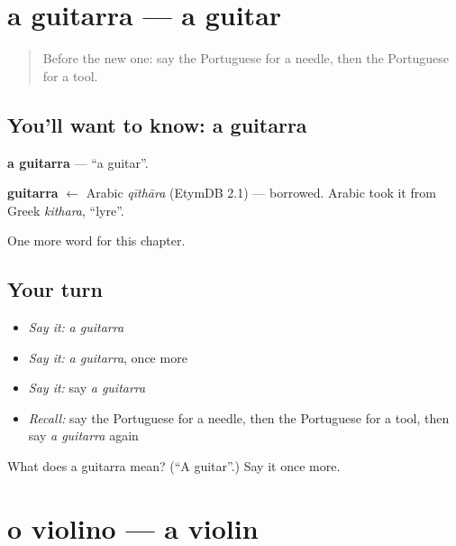\section[a guitarra]{a guitarra — a guitar}

\label{lesson:PT-C196-guitarra}



\begin{quote}
Before the new one: say the Portuguese for a needle, then the Portuguese for a tool.
\end{quote}

\subsection*{You'll want to know: a guitarra}
\textbf{a guitarra} — \textquotedblleft{}a guitar\textquotedblright{}.

\begin{cousinweb}
\textbf{guitarra} $\leftarrow$ Arabic \emph{qīthāra} (EtymDB 2.1) — borrowed. Arabic took it from Greek \emph{kithara}, \textquotedblleft{}lyre\textquotedblright{}.
\end{cousinweb}

\begin{grammarlens}[title={What you've built}]
One more word for this chapter.
\end{grammarlens}

\subsection*{Your turn}
\begin{itemize}
\raggedright
  \item \emph{Say it:} \emph{a guitarra}
  \item \emph{Say it:} \emph{a guitarra}, once more
  \item \emph{Say it:} say \emph{a guitarra}
  \item \emph{Recall:} say the Portuguese for a needle, then the Portuguese for a tool, then say \emph{a guitarra} again
\end{itemize}

\begin{tcolorbox}[breakable,colback=teal!4,colframe=teal!35!black,title={Before you move on}]
What does a guitarra mean? (\textquotedblleft{}A guitar\textquotedblright{}.) Say it once more.
\end{tcolorbox}
\section[o violino]{o violino — a violin}

